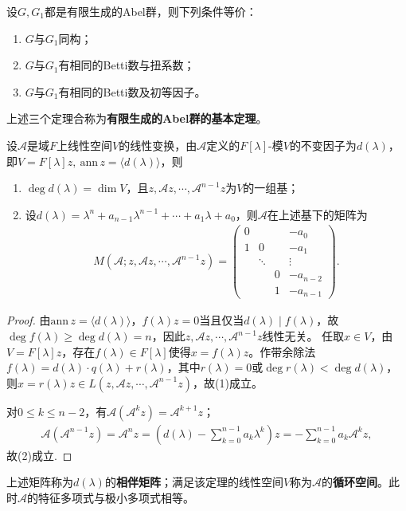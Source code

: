 \documentclass[../../main.tex]{subfiles}%
\begin{document}
\begin{theorem}
设$G,G_1$都是有限生成的Abel群，则下列条件等价：
\begin{enumerate}[(1)]
\item $G$与$G_1$同构；
\item $G$与$G_1$有相同的Betti数与扭系数；
\item $G$与$G_1$有相同的Betti数及初等因子。
\end{enumerate}
\end{theorem}
\begin{remark}
上述三个定理合称为\textbf{有限生成的Abel群的基本定理}。
\end{remark}

\begin{theorem}
设$\mathscr{A}$是域$F$上线性空间$V$的线性变换，由$\mathscr{A}$定义的$F[\lambda]$-模$V$的不变因子为$d(\lambda)$，即$V=F[\lambda]z,\ \mathrm{ann}\,z=\langle d(\lambda)\rangle$，则
\begin{enumerate}[(1)]
\item $\deg d(\lambda)=\dim V$，且$z,\mathscr{A}z,\cdots,\mathscr{A}^{n-1}z$为$V$的一组基；
\item 设$d(\lambda)=\lambda^n+a_{n-1}\lambda^{n-1}+\cdots+a_1\lambda+a_0$，则$\mathscr{A}$在上述基下的矩阵为
\begin{align*}
M(\mathscr{A};z,\mathscr{A}z,\cdots,\mathscr{A}^{n-1}z)=
\begin{pmatrix}
0&&&-a_0\\
1&0&&-a_1\\
&\ddots&&\vdots\\
&&0&-a_{n-2}\\
&&1&-a_{n-1}
\end{pmatrix}.
\end{align*}
\end{enumerate}
\end{theorem}
\begin{proof}

由$\mathrm{ann}\,z=\langle d(\lambda)\rangle$，$f(\lambda)z=0$当且仅当$d(\lambda)\mid f(\lambda)$，故$\deg f(\lambda)\geqslant\deg d(\lambda)=n$，因此$z,\mathscr{A}z,\cdots,\mathscr{A}^{n-1}z$线性无关。
任取$x\in V$，由$V=F[\lambda]z$，存在$f(\lambda)\in F[\lambda]$使得$x=f(\lambda)z$。作带余除法$f(\lambda)=d(\lambda)\cdot q(\lambda)+r(\lambda)$，其中$r(\lambda)=0$或$\deg r(\lambda)<\deg d(\lambda)$，则$x=r(\lambda)z\in L(z,\mathscr{A}z,\cdots,\mathscr{A}^{n-1}z)$，故(1)成立。

对$0\leqslant k\leqslant n-2$，有$\mathscr{A}(\mathscr{A}^kz)=\mathscr{A}^{k+1}z$；
\begin{align*}
\mathscr{A}(\mathscr{A}^{n-1}z)=\mathscr{A}^nz=\left(d(\lambda)-\sum_{k=0}^{n-1}a_k\lambda^k\right)z=-\sum_{k=0}^{n-1}a_k\mathscr{A}^kz,
\end{align*}
故(2)成立.

\end{proof}
\begin{remark}
上述矩阵称为$d(\lambda)$的\textbf{相伴矩阵}；满足该定理的线性空间$V$称为$\mathscr{A}$的\textbf{循环空间}。此时$\mathscr{A}$的特征多项式与极小多项式相等。
\end{remark}
\end{document}
